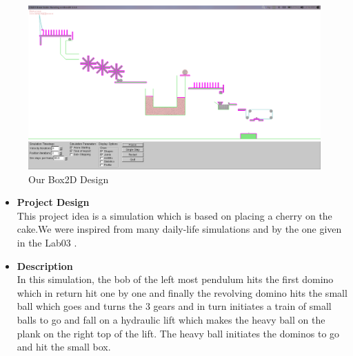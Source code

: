 \documentclass{article}
\begin{document}
\begin{figure}[h]
\centering
\includegraphics[width=1 \linewidth]{suraj.png}
\caption{\large Our Box2D Design}
\end{figure}
\begin{itemize}
	\item[] \textbf{\LARGE Project Design} \vspace{0cm} \\
	\large This project idea is a simulation which is based on placing a cherry on the cake.We were inspired from many daily-life simulations and by the one given in the Lab03 .  \vspace{0.4cm}
	\item[] \textbf{\LARGE Description} \vspace{0cm} \\
	\large In this simulation, the bob of the left most pendulum hits the first domino which in return hit one by one and finally the revolving domino hits the small ball which goes and turns the 3 gears and in turn initiates a train of small balls to go and fall on a hydraulic lift  which makes the heavy ball on the plank on the right top of the lift. The heavy ball initiates the dominos to go and hit the small box.\\
 \end{itemize}
\clearpage
\end{document}
